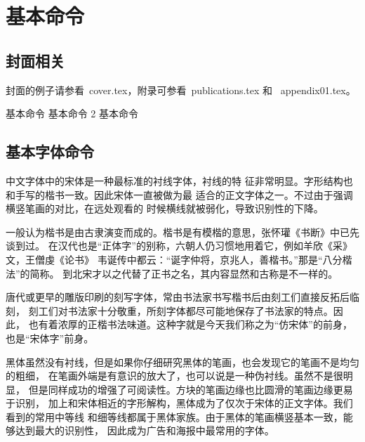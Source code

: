 

\chapter{基本命令}
\thispagestyle{plain}
\renewcommand{\currentchapter}{\thechapter \textbf{基本命令}}
\label{cha:command}


\section{封面相关}
\label{sec:cover}

封面的例子请参看~cover.tex，附录可参看~publications.tex 和
~appendix01.tex。

{ 基本命令}
{ 基本命令}
2 基本命令

\section{基本字体命令}
\label{sec:font}

中文字体中的宋体是一种最标准的衬线字体，衬线的特
征非常明显。字形结构也和手写的楷书一致。因此宋体一直被做为最
适合的正文字体之一。不过由于强调横竖笔画的对比，在远处观看的
时候横线就被弱化，导致识别性的下降。

{\kai
一般认为楷书是由古隶演变而成的。楷书是有模楷的意思，张怀瓘《书断》中已先谈到过。
在汉代也是“正体字”的别称，六朝人仍习惯地用着它，例如羊欣《采》文，王僧虔《论书》
韦诞传中都云：“诞字仲将，京兆人，善楷书。”那是“八分楷法”的简称。
到北宋才以之代替了正书之名，其内容显然和古称是不一样的。}

{\fs
唐代或更早的雕版印刷的刻写字体，常由书法家书写楷书后由刻工们直接反拓后临刻，
刻工们对书法家十分敬重，所刻字体都尽可能地保存了书法家的特点。因此，
也有着浓厚的正楷书法味道。这种字就是今天我们称之为“仿宋体”的前身，
也是“宋体字”前身。}


{\hei
黑体虽然没有衬线，但是如果你仔细研究黑体的笔画，也会发现它的笔画不是均匀的粗细，
在笔画外端是有意识的放大了，也可以说是一种伪衬线。虽然不是很明显，
但是同样成功的增强了可阅读性。方块的笔画边缘也比圆滑的笔画边缘更易于识别，
加上和宋体相近的字形解构，黑体成为了仅次于宋体的正文字体。我们看到的常用中等线
和细等线都属于黑体家族。由于黑体的笔画横竖基本一致，能够达到最大的识别性，
因此成为广告和海报中最常用的字体。}

